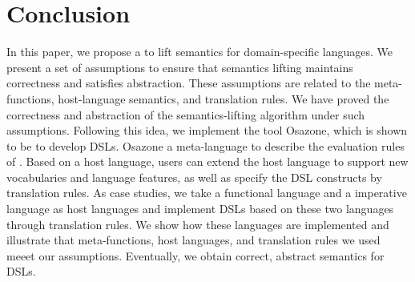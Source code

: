 \section{Conclusion}

In this paper, we propose a  to lift semantics for domain-specific languages.
We present a  set of assumptions to ensure that semantics lifting maintains correctness and satisfies abstraction.
These assumptions are related to the meta-functions, host-language semantics, and translation rules.
We have proved the correctness and abstraction of the semantics-lifting algorithm under such assumptions.
Following this idea, we implement the tool Osazone, which is shown to be  to develop DSLs.
Osazone  a meta-language to describe the evaluation rules of .
Based on a host language, users can extend the host language to support new vocabularies and language features,
 as well as specify the DSL constructs by translation rules.
As case studies, we take a functional language and a imperative language as host languages and implement DSLs based on these two languages through translation rules. We show how these languages are implemented and illustrate that meta-functions, host languages, and translation rules we used meeet our assumptions. Eventually, we obtain correct, abstract semantics for DSLs.
